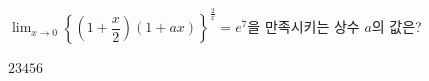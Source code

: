 $\displaystyle\lim_{x\to 0}\left\{\left(1+\dfrac{x}{2}\right)(1+ax)\right\}^{\frac{2}{x}}=e^7$을 만족시키는 상수 $a$의 값은?
\begin{choices32}{$2$}{$3$}{$4$}{$5$}{$6$}\end{choices32}
